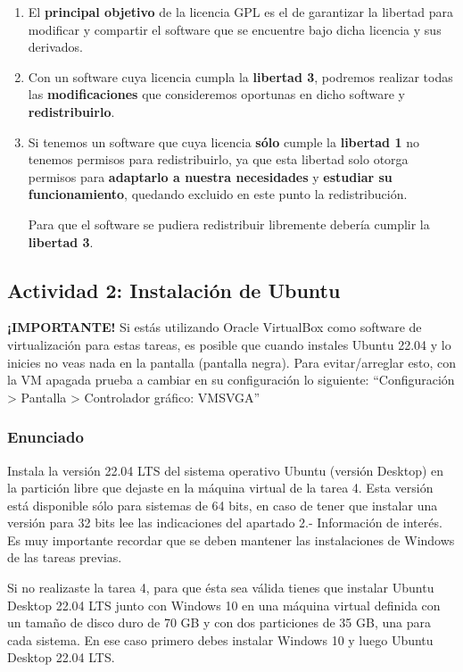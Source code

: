 \begin{enumerate}[label=\alph*.]
    \item El \textbf{principal objetivo} de la licencia GPL es el de garantizar la libertad para modificar y compartir el software que se encuentre bajo dicha licencia y sus derivados.

    \item Con un software cuya licencia cumpla la \textbf{libertad 3}, podremos realizar todas las \textbf{modificaciones} que consideremos oportunas en dicho software y \textbf{redistribuirlo}.

    \item Si tenemos un software que cuya licencia \textbf{sólo} cumple la \textbf{libertad 1} no tenemos permisos para redistribuirlo, ya que esta libertad solo otorga permisos para \textbf{adaptarlo a nuestra necesidades} y \textbf{estudiar su funcionamiento}, quedando excluido en este punto la redistribución.

    Para que el software se pudiera redistribuir libremente debería cumplir la \textbf{libertad 3}.
\end{enumerate}

\subsection{Actividad 2: Instalación de Ubuntu}

\textbf{¡IMPORTANTE!} Si estás utilizando Oracle VirtualBox como software de virtualización para estas tareas, es posible que cuando instales Ubuntu 22.04 y lo inicies no veas nada en la pantalla (pantalla negra). Para evitar/arreglar esto, con la VM apagada prueba a cambiar en su configuración lo siguiente: ``Configuración > Pantalla > Controlador gráfico: VMSVGA''

\subsubsection{Enunciado}
Instala la versión 22.04 LTS del sistema operativo Ubuntu (versión Desktop) en la partición libre que dejaste en la máquina virtual de la tarea 4. Esta versión está disponible sólo para sistemas de 64 bits, en caso de tener que instalar una versión para 32 bits lee las indicaciones del apartado 2.- Información de interés. Es muy importante recordar que se deben mantener las instalaciones de Windows de las tareas previas.

Si no realizaste la tarea 4, para que ésta sea válida tienes que instalar Ubuntu Desktop 22.04 LTS junto con Windows 10 en una máquina virtual definida con un tamaño de disco duro de 70 GB y con dos particiones de 35 GB, una para cada sistema. En ese caso primero debes instalar Windows 10 y luego Ubuntu Desktop  22.04 LTS.

